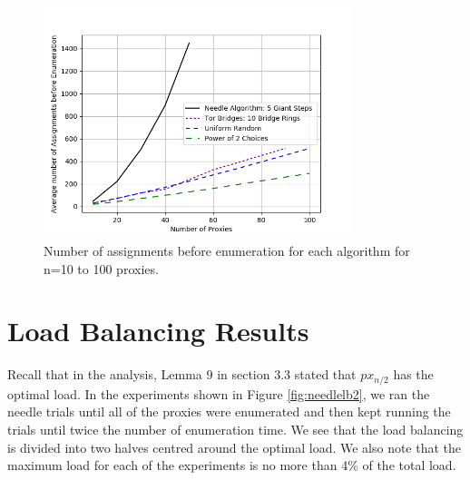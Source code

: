 \begin{figure}[h!]
\centering
     \includegraphics[width=0.8\textwidth]{fig/comparison_graph.png}
    \caption{Number of assignments before enumeration for each algorithm for n=10 to 100 proxies.}

    \label{fig:comparison}
\end{figure}

\section{Load Balancing Results}

Recall that in the analysis, Lemma $9$ in section $3.3$ stated that $px_{n/2}$ has the optimal load. In the experiments shown in Figure \ref{fig:needlelb2}, we ran the needle trials until all of the proxies were enumerated and then kept running the trials until twice the number of enumeration time. We see that the load balancing is divided into two halves centred around the optimal load. We also note that the maximum load for each of the experiments is no more than 4\% of the total load.

